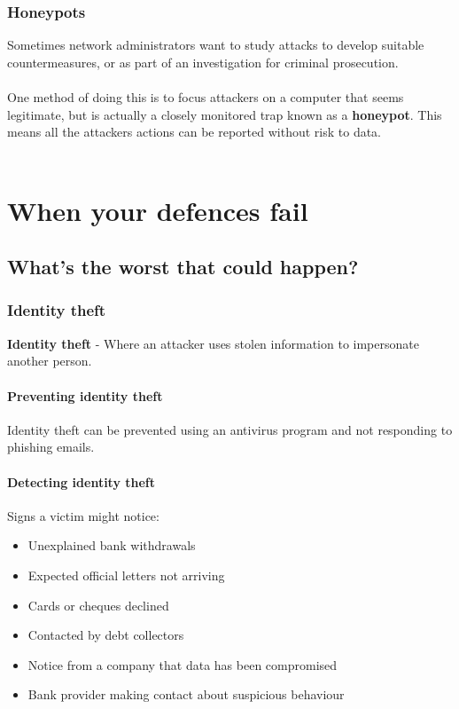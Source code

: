 \documentclass{article}[18pt]
\begin{document}
\subsubsection{Honeypots}
Sometimes network administrators want to study attacks to develop suitable countermeasures, or as part of an investigation for criminal prosecution.\\
\\
One method of doing this is to focus attackers on a computer that seems legitimate, but is actually a closely monitored trap known as a \textbf{honeypot}. This means all the attackers actions can be reported without risk to data.\\
\\
\section{When your defences fail}
\subsection{What's the worst that could happen?}
\subsubsection{Identity theft}
\textbf{Identity theft} - Where an attacker uses stolen information to impersonate another person.\\
\paragraph{Preventing identity theft}
Identity theft can be prevented using an antivirus program and not responding to phishing emails.
\paragraph{Detecting identity theft}
Signs a victim might notice:
\begin{itemize}
\item Unexplained bank withdrawals
\item Expected official letters not arriving
\item Cards or cheques declined
\item Contacted by debt collectors
\item Notice from a company that data has been compromised
\item Bank provider making contact about suspicious behaviour
\end{itemize}
\end{document}
